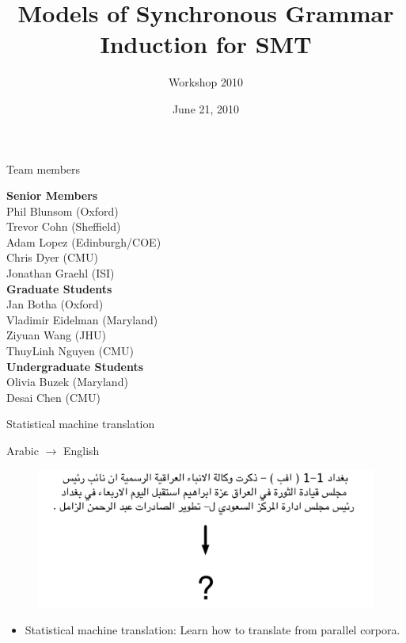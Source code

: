 \documentclass{beamer}
\title[Models of SCFG Induction]{Models of Synchronous Grammar Induction for SMT}
\author[CLSP Workshop 2010]{
  Workshop 2010
}
\institute[Baltimore]{
  The Center for Speech and Language Processing \\ Johns Hopkins University
}
\date[June 21]{June 21, 2010}
\begin{document}
\begin{frame}
  \titlepage
\end{frame}

 


\begin{frame}[t]{Team members}
\begin{center}
{\bf Senior Members} \\
  Phil Blunsom (Oxford)\\
  Trevor Cohn (Sheffield)\\
  Adam Lopez (Edinburgh/COE)\\
  Chris Dyer (CMU)\\
  Jonathan Graehl (ISI)\\
\vspace{0.2in}
{\bf Graduate Students} \\
  Jan Botha (Oxford) \\
  Vladimir Eidelman (Maryland) \\
  Ziyuan Wang (JHU) \\
  ThuyLinh Nguyen (CMU) \\
\vspace{0.2in}
{\bf Undergraduate Students} \\
  Olivia Buzek (Maryland) \\
  Desai Chen (CMU) \\
\end{center}
\end{frame}



\begin{frame}[t]{Statistical machine translation}
\begin{exampleblock}{Arabic $\rightarrow$ English}
  \begin{figure}
    {\centering \includegraphics[scale=0.55]{arabic.pdf}}
  \end{figure}
\vspace{0.10cm}
\end{exampleblock}
\begin{itemize}
  \item Statistical machine translation: Learn how to translate from parallel corpora.
\end{itemize}
\end{frame}
\end{document}
